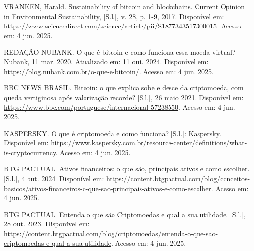 \renewcommand{\refname}{}  %
\vspace*{-1.5cm}           %

\begin{thebibliography}{99}
\sloppy

     VRANKEN, Harald. Sustainability of bitcoin and blockchains. Current Opinion in Environmental Sustainability, [S.l.], v. 28, p. 1-9, 2017. Disponível em: 
    \href{https://www.sciencedirect.com/science/article/pii/S1877343517300015}{https://www.sciencedirect.com/science/article/pii/S1877343517300015}.
    Acesso em: 4 jun. 2025.
    
     REDAÇÃO NUBANK. O que é bitcoin e como funciona essa moeda virtual? Nubank, 11 mar. 2020. Atualizado em: 11 out. 2024. Disponível em: 
    \href{https://blog.nubank.com.br/o-que-e-bitcoin/}{https://blog.nubank.com.br/o-que-e-bitcoin/}.
    Acesso em: 4 jun. 2025.
    
     BBC NEWS BRASIL. Bitcoin: o que explica sobe e desce da criptomoeda, com queda vertiginosa após valorização recorde? [S.l.], 26 maio 2021. Disponível em: 
    \href{https://www.bbc.com/portuguese/internacional-57238550}{https://www.bbc.com/portuguese/internacional-57238550}.
    Acesso em: 4 jun. 2025.
    
     KASPERSKY. O que é criptomoeda e como funciona? [S.l.]: Kaspersky. Disponível em: 
    \href{https://www.kaspersky.com.br/resource-center/definitions/what-is-cryptocurrency}{https://www.kaspersky.com.br/resource-center/definitions/what-is-cryptocurrency}. 
    Acesso em: 4 jun. 2025.
    
     BTG PACTUAL. Ativos financeiros: o que são, principais ativos e como escolher. [S.l.], 4 out. 2024. Disponível em:
    \href{https://content.btgpactual.com/blog/conceitos-basicos/ativos-financeiros-o-que-sao-principais-ativos-e-como-escolher}{https://content.btgpactual.com/blog/conceitos-basicos/ativos-financeiros-o-que-sao-principais-ativos-e-como-escolher}.
    Acesso em: 4 jun. 2025.
    
     BTG PACTUAL. Entenda o que são Criptomoedas e qual a sua utilidade. [S.l.],  28 out. 2023. Disponível em: 
    \href{https://content.btgpactual.com/blog/criptomoedas/entenda-o-que-sao-criptomoedas-e-qual-a-sua-utilidade}{https://content.btgpactual.com/blog/criptomoedas/entenda-o-que-sao-criptomoedas-e-qual-a-sua-utilidade}. 
    Acesso em: 4 jun. 2025.
    

\end{thebibliography}
